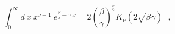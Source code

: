 \begin{equation}
\int _{0}^{\infty} d~x ~x^{\nu -1} ~e^{ \frac {\beta}{x} - \gamma ~x } = 2
( \frac {\beta}{\gamma} )^{\frac {\nu}{2} } {\mathit {K}}_{\nu}(2 \sqrt
\beta \gamma) ~~~,
\end{equation}

